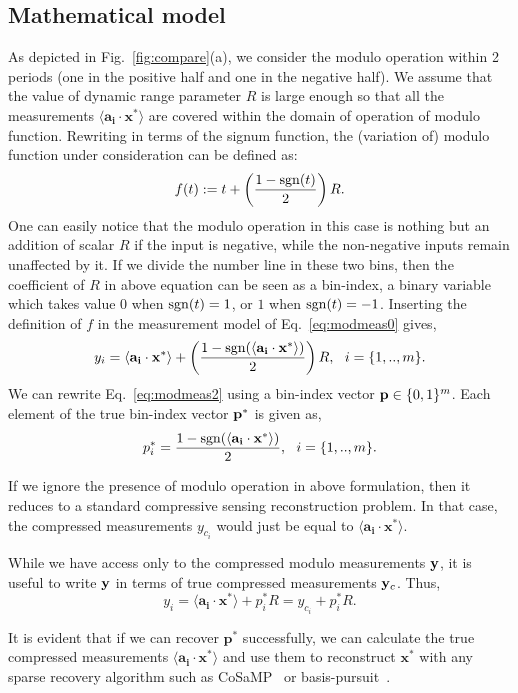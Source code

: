 \subsection{Mathematical model}
\label{subsec:model}
As depicted in Fig.~\ref{fig:compare}(a), we consider the modulo operation within 2 periods (one in the positive half and one in the negative half). We assume  that the value of dynamic range parameter $R$ is large enough so that all the measurements $\langle \mathbf{a_i} \cdot \mathbf{x^*} \rangle$ are covered within the domain of operation of modulo function. Rewriting in terms of the signum function, the (variation of) modulo function under consideration can be defined as: 
$$
f(t) := t+\left( \frac{1-\mathrm{sgn}(t)}{2}\right)R.
$$
One can easily notice that the modulo operation in this case is nothing but an addition of scalar $R$ if the input is negative, while the non-negative inputs remain unaffected by it. If we divide the number line in these two bins, then the coefficient of $R$ in above equation can be seen as a bin-index, a binary variable which takes value $0$ when $\mathrm{sgn}(t)=1$, or $1$ when $\mathrm{sgn}(t)=-1$.
Inserting the definition of $f$ in the measurement model of Eq.~\ref{eq:modmeas0} gives,
\begin{equation}
y_i= \langle \mathbf{a_i} \cdot \mathbf{x^*} \rangle+\left( \frac{1-\sgn(\langle \mathbf{a_i} \cdot \mathbf{x^*} \rangle)}{2}\right)R,~~i = \{1,..,m\}.
\label{eq:modmeas2}
\end{equation} 
We can rewrite Eq.~\ref{eq:modmeas2} using a bin-index vector $\mathbf{p} \in \{0,1\}^m$. Each element of the true bin-index vector $\mathbf{p}^*$ is given as,
$$
p^*_i = \frac{1-\mathrm{sgn}(\langle \mathbf{a_i} \cdot \mathbf{x^*} \rangle)}{2},~~i = \{1,..,m\}.
$$


If we ignore the presence of modulo operation in above formulation, then it reduces to a standard compressive sensing reconstruction problem. In that case, the compressed measurements $y_{c_i}$ would just be equal to $\langle \mathbf{a_i} \cdot \mathbf{x^*} \rangle$.    %

While we have access only to the compressed modulo measurements $\mathbf{y}$, it is useful to write $\mathbf{y}$ in terms of true compressed measurements $\mathbf{y}_c$. Thus,
$$
y_i = \langle \mathbf{a_i} \cdot \mathbf{x^*} \rangle + p^*_iR = y_{c_i}+p^*_iR.
$$

It is evident that if we can recover $\mathbf{p^*}$ successfully, we can calculate the true compressed measurements $\langle \mathbf{a_i} \cdot \mathbf{x^*} \rangle$ and use them to reconstruct $\mathbf{x^*}$ with any sparse recovery algorithm such as CoSaMP~\cite{needell2010cosamp} or basis-pursuit~\cite{chen2001atomic,spgl1:2007,BergFriedlander:2008}.
